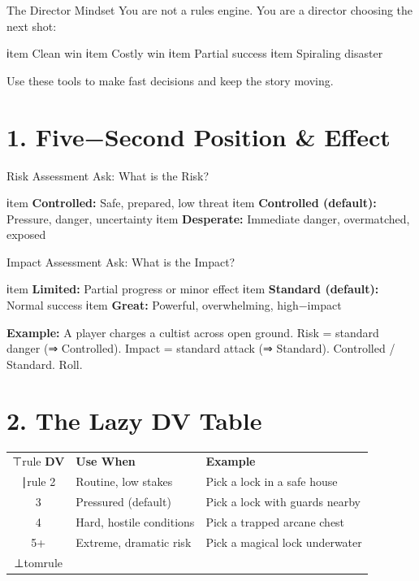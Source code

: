 \sectionrule

\begin{kitbox}{The Director Mindset}
You are not a rules engine. You are a director choosing the next shot:
\begin{itemize}
    ℹtem Clean win
    ℹtem Costly win  
    ℹtem Partial success
    ℹtem Spiraling disaster
\end{itemize}
Use these tools to make fast decisions and keep the story moving.
\end{kitbox}

\sectionrule

\section*{1. Five−Second Position & Effect}

\begin{quickbox}{Risk Assessment}
Ask: What is the Risk?
\begin{itemize}
    ℹtem \textbf{Controlled:} Safe, prepared, low threat
    ℹtem \textbf{Controlled (default):} Pressure, danger, uncertainty  
    ℹtem \textbf{Desperate:} Immediate danger, overmatched, exposed
\end{itemize}
\end{quickbox}

\begin{quickbox}{Impact Assessment}
Ask: What is the Impact?
\begin{itemize}
    ℹtem \textbf{Limited:} Partial progress or minor effect
    ℹtem \textbf{Standard (default):} Normal success
    ℹtem \textbf{Great:} Powerful, overwhelming, high−impact
\end{itemize}
\end{quickbox}

\textbf{Example:} A player charges a cultist across open ground. Risk = standard danger (⇒ Controlled). Impact = standard attack (⇒ Standard). Controlled / Standard. Roll.

\sectionrule

\section*{2. The Lazy DV Table}

\begin{tabularx}{\textwidth}{clX}
⊤rule
\textbf{DV} & \textbf{Use When} & \textbf{Example} \\
∣rule
2 & Routine, low stakes & Pick a lock in a safe house \\
3 & Pressured (default) & Pick a lock with guards nearby \\
4 & Hard, hostile conditions & Pick a trapped arcane chest \\
5+ & Extreme, dramatic risk & Pick a magical lock underwater \\
⊥tomrule
\end{tabularx}

